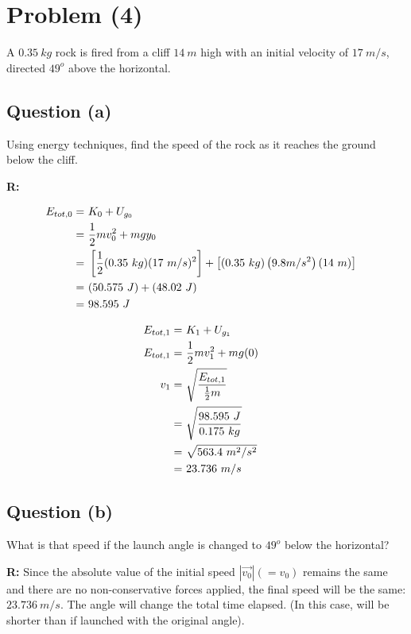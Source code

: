 \section{Problem (4)}

	A $0.35 \ kg$ rock is fired from a cliff $14 \ m$ high with an initial velocity of $17 \ m/s$, directed $49^{o}$ above the horizontal.

	\subsection{Question (a)}

		Using energy techniques, find the speed of the rock as it reaches the ground below the cliff.

		\textbf{R:}

		\begin{align}
			E_{tot,0} = \ &K_{0} + U_{g_{0}}& \notag \\
			= \ &\frac{1}{2}mv_{0}^{2} + mgy_{0}& \notag \\
			= \ &\left[\frac{1}{2}(0.35 \ kg)(17 \ m/s)^{2}\right] + \left[(0.35 \ kg)\left(9.8 m/s^{2}\right)(14 \ m)\right]& \notag \\
			= \ &(50.575 \ J) + (48.02 \ J)& \notag \\
			= \ &98.595 \ J& \notag
		\end{align}

		\begin{align}
			E_{tot,1} = \ &K_{1} + U_{g_{1}}& \notag \\
			E_{tot,1} = \ &\frac{1}{2} mv_{1}^{2} + mg(0)& \notag \\
			v_{1} = \ &\sqrt{\frac{E_{tot,1}}{\frac{1}{2}m}}& \notag \\
			= \ &\sqrt{\frac{98.595 \ J}{0.175 \ kg}}& \notag \\
			= \ &\sqrt{563.4 \ m^{2}/s^{2}}& \notag \\
			= \ &23.736 \ m/s&
		\end{align}

	\subsection{Question (b)}

		What is that speed if the launch angle is changed to $49^{o}$ below the horizontal?

		\textbf{R:} Since the absolute value of the initial speed $|\vec{v_{0}}| (= v_{0})$ remains the same and there are no non-conservative forces applied, the final speed will be the same: $23.736 \ m/s$. The angle will change the total time elapsed. (In this case, will be shorter than if launched with the original angle).

